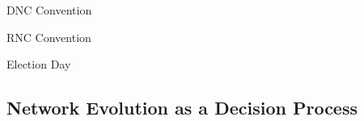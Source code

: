 \documentclass{beamer}
\begin{document}


\begin{frame}
\begin{block}{DNC Convention}
\center
{}
\end{block}
\end{frame}

\begin{frame}
\begin{block}{RNC Convention}
\center
{}
\end{block}
\end{frame}

\begin{frame}
\begin{block}{Election Day}
\center
{}
\end{block}
\end{frame}




\subsection{Network Evolution as a Decision Process}
\end{document}
